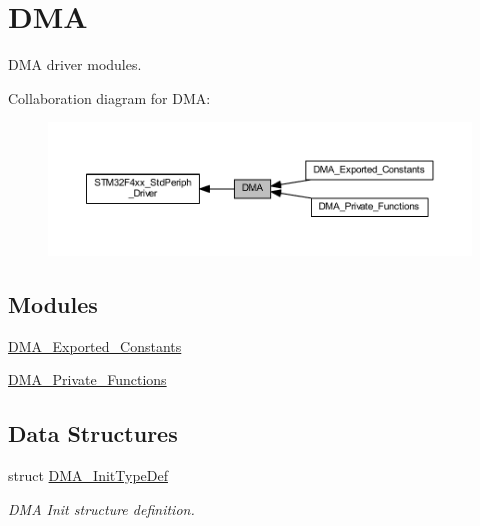 \hypertarget{group___d_m_a}{}\section{D\+MA}
\label{group___d_m_a}


D\+MA driver modules.  


Collaboration diagram for D\+MA\+:\nopagebreak
\begin{figure}[H]
\begin{center}
\leavevmode
\includegraphics[width=350pt]{group___d_m_a}
\end{center}
\end{figure}
\subsection*{Modules}
\begin{DoxyCompactItemize}
\item 
\hyperlink{group___d_m_a___exported___constants}{D\+M\+A\+\_\+\+Exported\+\_\+\+Constants}
\item 
\hyperlink{group___d_m_a___private___functions}{D\+M\+A\+\_\+\+Private\+\_\+\+Functions}
\end{DoxyCompactItemize}
\subsection*{Data Structures}
\begin{DoxyCompactItemize}
\item 
struct \hyperlink{struct_d_m_a___init_type_def}{D\+M\+A\+\_\+\+Init\+Type\+Def}
\begin{DoxyCompactList}\small\item\em D\+MA Init structure definition. \end{DoxyCompactList}\end{DoxyCompactItemize}
